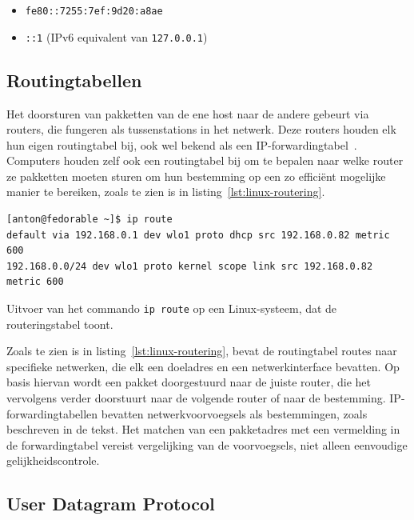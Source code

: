 \begin{itemize}
    \item \texttt{fe80::7255:7ef:9d20:a8ae}
    \item \texttt{::1} (IPv6 equivalent van \texttt{127.0.0.1})
\end{itemize}

\subsection{Routingtabellen}
\label{netwerk_routeringstabel}

Het doorsturen van pakketten van de ene host naar de andere gebeurt via routers, die fungeren als tussenstations in het netwerk.
Deze routers houden elk hun eigen routingtabel bij, ook wel bekend als een IP-forwardingtabel~\autocite{dordal2020}.
Computers houden zelf ook een routingtabel bij om te bepalen naar welke router ze pakketten moeten sturen om hun bestemming op een zo efficiënt mogelijke manier te bereiken, zoals te zien is in listing~\ref{lst:linux-routering}.

\begin{listing}
  \begin{verbatim}
[anton@fedorable ~]$ ip route
default via 192.168.0.1 dev wlo1 proto dhcp src 192.168.0.82 metric 600
192.168.0.0/24 dev wlo1 proto kernel scope link src 192.168.0.82 metric 600
  \end{verbatim}
  \caption[Routeringstabel met \texttt{ip route}.]{Uitvoer van het commando \texttt{ip route} op een Linux-systeem, dat de routeringstabel toont.}
  \label{lst:linux-routering}
\end{listing}

Zoals te zien is in listing~\ref{lst:linux-routering}, bevat de routingtabel routes naar specifieke netwerken, die elk een doeladres en een netwerkinterface bevatten.
Op basis hiervan wordt een pakket doorgestuurd naar de juiste router, die het vervolgens verder doorstuurt naar de volgende router of naar de bestemming.
IP-forwardingtabellen bevatten netwerkvoorvoegsels als bestemmingen, zoals beschreven in de tekst.
Het matchen van een pakketadres met een vermelding in de forwardingtabel vereist vergelijking van de voorvoegsels, niet alleen eenvoudige gelijkheidscontrole.

\subsection{User Datagram Protocol}
\label{netwerk_udp}

